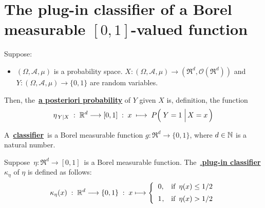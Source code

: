 

\section{The plug-in classifier of a Borel measurable $[0,1]$-valued function}
\setcounter{theorem}{0}
\setcounter{equation}{0}


\renewcommand{\theenumi}{\roman{enumi}}
\renewcommand{\labelenumi}{\textnormal{(\theenumi)}$\;\;$}


\begin{definition}
\mbox{}\vskip 0.1cm
\noindent
Suppose:
\begin{itemize}
\item
	$(\Omega,\mathcal{A},\mu)$ is a probability space.
	$X : (\Omega,\mathcal{A},\mu) \longrightarrow (\Re^{d},\mathcal{O}(\Re^{d}))$ and\,
	$Y : (\Omega,\mathcal{A},\mu) \longrightarrow \{0,1\}$
	are random variables.
\end{itemize}
Then, the \,\underline{\textbf{a posteriori probability}} of $Y$ given $X$ is, definition, the function
\begin{equation*}
\eta_{\,Y\vert X}
\;:\; \Re^{d} \longrightarrow [0,1]
\; :\; x \; \longmapsto \; P\!\left(\,\left. \overset{{\color{white}.}}{Y} = 1 \;\right\vert X = x\,\right)
\end{equation*}
\end{definition}


\vskip 0.5cm

\begin{definition}[Classifier]
\mbox{}\vskip 0.1cm
\noindent
A \,\underline{\textbf{classifier}}\, is a Borel measurable function
$g : \Re^{d} \longrightarrow \{0,1\}$,
where $d \in \mathbb{N}$ is a natural number.
\end{definition}


\vskip 0.5cm

\begin{definition} %
\mbox{}\vskip 0.1cm
\noindent
Suppose \,$\eta : \Re^{d} \longrightarrow [0,1]$\, is a Borel measurable function.
The \,\underline{{\color{white}.}\textbf{plug-in classifier}}\, $\kappa_{\eta}$ of $\eta$ is defined as follows:
\begin{equation*}
\kappa_{\eta}(x) \; : \; \Re^{d} \longrightarrow \{0,1\} \; : \; x \longmapsto
	\left\{\begin{array}{cl}
		0, & \textnormal{if \,$\eta(x) \leq 1/2$}
		\\
		\overset{{\color{white}-}}{1}, & \textnormal{if \,$\eta(x) > 1/2$}
	\end{array}\right.
\end{equation*}
\end{definition}


